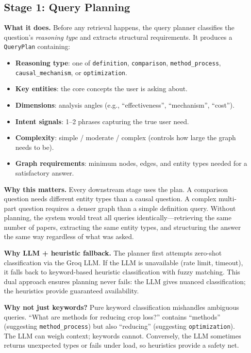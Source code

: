 \documentclass[11pt]{article}
\begin{document}
\subsection{Stage 1: Query Planning}

\textbf{What it does.} Before any retrieval happens, the query planner classifies the question's \emph{reasoning type} and extracts structural requirements. It produces a \texttt{QueryPlan} containing:
\begin{itemize}[leftmargin=1.2em]
  \item \textbf{Reasoning type}: one of \texttt{definition}, \texttt{comparison}, \texttt{method\_process}, \texttt{causal\_mechanism}, or \texttt{optimization}.
  \item \textbf{Key entities}: the core concepts the user is asking about.
  \item \textbf{Dimensions}: analysis angles (e.g., ``effectiveness'', ``mechanism'', ``cost'').
  \item \textbf{Intent signals}: 1--2 phrases capturing the true user need.
  \item \textbf{Complexity}: simple / moderate / complex (controls how large the graph needs to be).
  \item \textbf{Graph requirements}: minimum nodes, edges, and entity types needed for a satisfactory answer.
\end{itemize}

\textbf{Why this matters.} Every downstream stage uses the plan. A comparison question needs different entity types than a causal question. A complex multi-part question requires a denser graph than a simple definition query. Without planning, the system would treat all queries identically---retrieving the same number of papers, extracting the same entity types, and structuring the answer the same way regardless of what was asked.

\textbf{Why LLM + heuristic fallback.} The planner first attempts zero-shot classification via the Groq LLM. If the LLM is unavailable (rate limit, timeout), it falls back to keyword-based heuristic classification with fuzzy matching. This dual approach ensures planning never fails: the LLM gives nuanced classification; the heuristics provide guaranteed availability.

\textbf{Why not just keywords?} Pure keyword classification mishandles ambiguous queries. ``What are methods for reducing crop loss?'' contains ``methods'' (suggesting \texttt{method\_process}) but also ``reducing'' (suggesting \texttt{optimization}). The LLM can weigh context; keywords cannot. Conversely, the LLM sometimes returns unexpected types or fails under load, so heuristics provide a safety net.
\end{document}
